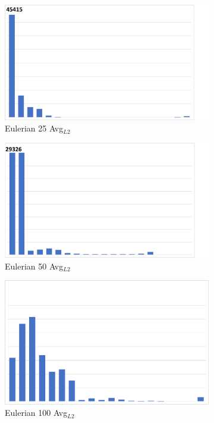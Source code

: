 \begin{figure}
\begin{subfigure}{0.24\textwidth}
\centering
\includegraphics[width=0.7\linewidth, trim={0cm 0cm 2.5cm 0cm}, clip]{results/nyx/Eul25_AvgL2.pdf}
\caption{Eulerian 25 Avg$_{L2}$}
\end{subfigure}
\hspace{1mm}
\begin{subfigure}{0.24\textwidth}
\centering
\includegraphics[width=0.7\linewidth, trim={0cm 0cm 2.5cm 0cm}, clip]{results/nyx/Eul50_AvgL2.pdf}
\caption{Eulerian 50 Avg$_{L2}$}
\end{subfigure}
\begin{subfigure}{0.24\textwidth}
\centering
\includegraphics[width=0.7\linewidth]{results/nyx/Eul100_AvgL2.pdf}
\caption{Eulerian 100 Avg$_{L2}$}
\end{subfigure}
\hspace{1mm}
\begin{subfigure}{0.24\textwidth}

\end{subfigure}
\end{figure}
